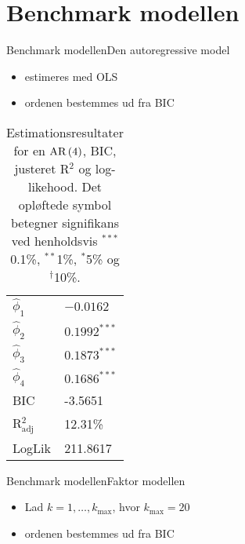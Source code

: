 \section{Benchmark modellen}
\begin{frame}{Benchmark modellen}{Den autoregressive model}
\begin{itemize}
\item estimeres med OLS
\item ordenen bestemmes ud fra BIC
\end{itemize}
\begin{table}[h]
\center
\begin{tabular}{ll}
\toprule
$\widehat{\phi}_1$ &$ -0.0162 $ \\
$\widehat{\phi}_2$ & $0.1992^{***}$  \\
$\widehat{\phi}_3$ &$0.1873^{***}$  \\
$\widehat{\phi}_4$ &$0.1686^{***} $ \\ \midrule
BIC & -3.5651 \\
 R$^2_{\text{adj}}$ & 12.31\% \\
LogLik &  211.8617\\ \bottomrule
 \end{tabular}
\caption{Estimationsresultater for en \(\text{AR} \del{4}\), BIC, justeret R$^2$ og log-likehood. Det opløftede symbol betegner signifikans ved henholdsvis $^{***}$0.1\%, $^{**}$1\%, $^{*}$5\% og $^{\dagger}$10\%.} \label{tab:est_ar}
\end{table}
\end{frame}

\begin{frame}{Benchmark modellen}{Faktor modellen}
\begin{itemize}
\item Lad \(k = 1, \ldots, k_\text{max}\), hvor \(k_\text{max} = 20\)
\item ordenen bestemmes ud fra BIC
\end{itemize}

\end{frame}

